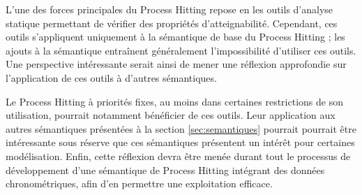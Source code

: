 L'une des forces principales du Process Hitting repose en les outils d'analyse statique permettant de vérifier des propriétés d'atteignabilité.
Cependant, ces outils s'appliquent uniquement à la sémantique de base du Process Hitting ;
les ajouts à la sémantique entraînent généralement l'impossibilité d'utiliser ces outils.
Une perspective intéressante serait ainsi de mener une réflexion approfondie sur l'application de ces outils à d'autres sémantiques.

Le Process Hitting à priorités fixes, au moins dans certaines restrictions de son utilisation, pourrait notamment bénéficier de ces outils.
Leur application aux autres sémantiques présentées à la section \ref{sec:semantiques} pourrait pourrait être intéressante sous réserve que ces sémantiques présentent un intérêt pour certaines modélisation.
Enfin, cette réflexion devra être menée durant tout le processus de développement d'une sémantique de Process Hitting intégrant des données chronométriques,
afin d'en permettre une exploitation efficace.

